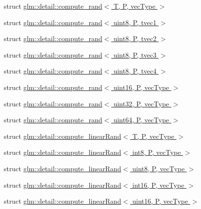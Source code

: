 \begin{DoxyCompactItemize}
\item 
struct \hyperlink{structglm_1_1detail_1_1compute__rand}{glm\-::detail\-::compute\-\_\-rand$<$ T, P, vec\-Type $>$}
\item 
struct \hyperlink{structglm_1_1detail_1_1compute__rand_3_01uint8_00_01P_00_01tvec1_01_4}{glm\-::detail\-::compute\-\_\-rand$<$ uint8, P, tvec1 $>$}
\item 
struct \hyperlink{structglm_1_1detail_1_1compute__rand_3_01uint8_00_01P_00_01tvec2_01_4}{glm\-::detail\-::compute\-\_\-rand$<$ uint8, P, tvec2 $>$}
\item 
struct \hyperlink{structglm_1_1detail_1_1compute__rand_3_01uint8_00_01P_00_01tvec3_01_4}{glm\-::detail\-::compute\-\_\-rand$<$ uint8, P, tvec3 $>$}
\item 
struct \hyperlink{structglm_1_1detail_1_1compute__rand_3_01uint8_00_01P_00_01tvec4_01_4}{glm\-::detail\-::compute\-\_\-rand$<$ uint8, P, tvec4 $>$}
\item 
struct \hyperlink{structglm_1_1detail_1_1compute__rand_3_01uint16_00_01P_00_01vecType_01_4}{glm\-::detail\-::compute\-\_\-rand$<$ uint16, P, vec\-Type $>$}
\item 
struct \hyperlink{structglm_1_1detail_1_1compute__rand_3_01uint32_00_01P_00_01vecType_01_4}{glm\-::detail\-::compute\-\_\-rand$<$ uint32, P, vec\-Type $>$}
\item 
struct \hyperlink{structglm_1_1detail_1_1compute__rand_3_01uint64_00_01P_00_01vecType_01_4}{glm\-::detail\-::compute\-\_\-rand$<$ uint64, P, vec\-Type $>$}
\item 
struct \hyperlink{structglm_1_1detail_1_1compute__linearRand}{glm\-::detail\-::compute\-\_\-linear\-Rand$<$ T, P, vec\-Type $>$}
\item 
struct \hyperlink{structglm_1_1detail_1_1compute__linearRand_3_01int8_00_01P_00_01vecType_01_4}{glm\-::detail\-::compute\-\_\-linear\-Rand$<$ int8, P, vec\-Type $>$}
\item 
struct \hyperlink{structglm_1_1detail_1_1compute__linearRand_3_01uint8_00_01P_00_01vecType_01_4}{glm\-::detail\-::compute\-\_\-linear\-Rand$<$ uint8, P, vec\-Type $>$}
\item 
struct \hyperlink{structglm_1_1detail_1_1compute__linearRand_3_01int16_00_01P_00_01vecType_01_4}{glm\-::detail\-::compute\-\_\-linear\-Rand$<$ int16, P, vec\-Type $>$}
\item 
struct \hyperlink{structglm_1_1detail_1_1compute__linearRand_3_01uint16_00_01P_00_01vecType_01_4}{glm\-::detail\-::compute\-\_\-linear\-Rand$<$ uint16, P, vec\-Type $>$}

\end{DoxyCompactItemize}
